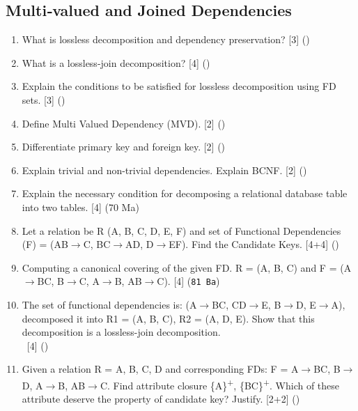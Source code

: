 \documentclass[12pt]{article}
\newcommand{\ra}{\rightarrow}
\newcommand{\enter}{\\\textcolor{white}{1}}
\newcommand{\super}[1]{\textsuperscript{#1}}
\begin{document}
    \subsection{Multi‐valued and Joined Dependencies}
    \begin{enumerate}[noitemsep, topsep = 0pt]
        \item What is lossless decomposition and dependency preservation? \hfill [3] ()

        \item What is a lossless-join decomposition? \hfill [4] ()

        \item Explain the conditions to be satisfied for lossless decomposition using FD sets. \hfill [3] ()
        
        \item Define Multi Valued Dependency (MVD). \hfill [2] ()
        
        \item Differentiate primary key and foreign key. \hfill [2] ()
        
        \item Explain trivial and non-trivial dependencies. Explain BCNF. \hfill [2] ()

        \item Explain the necessary condition for decomposing a relational database table into two tables. \hfill [4] (70 Ma)

        \item Let a relation be R (A, B, C, D, E, F) and set of Functional Dependencies (F) = (AB$\ra$C, BC$\ra$AD, D$\ra$EF). Find the Candidate Keys. \hfill [4+4] ()
        
        \item Computing a canonical covering of the given FD. R = (A, B, C) and F = (A$\ra$BC, B$\ra$C, A$\ra$B, AB$\ra$C). \hfill [4] (\texttt{81 Ba})
        
        \item The set of functional dependencies is: (A$\ra$BC, CD$\ra$E, B$\ra$D, E$\ra$A), decomposed it into R1 = (A, B, C), R2 = (A, D, E). Show that this decomposition is a lossless-join decomposition. 
        \enter\hfill [4] ()
        
        \item Given a relation R = {A, B, C, D} and corresponding FDs: F = {A$\ra$BC, B$\ra$D, A$\ra$B, AB$\ra$C}. Find attribute closure \{A\}\super{+}, \{BC\}\super{+}. Which of these attribute deserve the property of candidate key? Justify. \hfill [2+2] ()
        

\end{enumerate}
\end{document}
